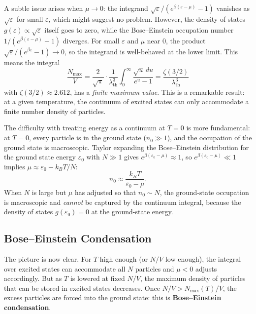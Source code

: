A subtle issue arises when $\mu \to 0$: the integrand $\sqrt{\varepsilon}/(e^{\beta(\varepsilon-\mu)}-1)$ vanishes as $\sqrt{\varepsilon}$ for small $\varepsilon$, which might suggest no problem. However, the density of states $g(\varepsilon) \propto \sqrt{\varepsilon}$ itself goes to zero, while the Bose--Einstein occupation number $1/(e^{\beta(\varepsilon-\mu)}-1)$ diverges. For small $\varepsilon$ and $\mu$ near 0, the product $\sqrt{\varepsilon}/(e^{\beta\varepsilon}-1) \to 0$, so the integrand is well-behaved at the lower limit. This means the integral
\begin{equation}
    \frac{N_{\text{max}}}{V} = \frac{2}{\sqrt{\pi}}\cdot\frac{1}{\lambda_{\text{th}}^3}\int_0^\infty \frac{\sqrt{u}\,du}{e^u - 1} = \frac{\zeta(3/2)}{\lambda_{\text{th}}^3}
\end{equation}
with $\zeta(3/2) \approx 2.612$, has a \emph{finite maximum value}. This is a remarkable result: at a given temperature, the continuum of excited states can only accommodate a finite number density of particles.

The difficulty with treating energy as a continuum at $T=0$ is more fundamental: at $T=0$, every particle is in the ground state ($n_0 \gg 1$), and the occupation of the ground state is macroscopic. Taylor expanding the Bose--Einstein distribution for the ground state energy $\varepsilon_0$ with $N \gg 1$ gives $e^{\beta(\varepsilon_0 - \mu)} \approx 1$, so $e^{\beta(\varepsilon_0 - \mu)} \ll 1$ implies $\mu \approx \varepsilon_0 - k_BT/N$:
\begin{equation}
    n_0 \approx \frac{k_BT}{\varepsilon_0 - \mu}.
\end{equation}
When $N$ is large but $\mu$ has adjusted so that $n_0 \sim N$, the ground-state occupation is macroscopic and \emph{cannot} be captured by the continuum integral, because the density of states $g(\varepsilon_0) = 0$ at the ground-state energy.

\subsection{Bose--Einstein Condensation}

The picture is now clear. For $T$ high enough (or $N/V$ low enough), the integral over excited states can accommodate all $N$ particles and $\mu < 0$ adjusts accordingly. But as $T$ is lowered at fixed $N/V$, the maximum density of particles that can be stored in excited states decreases. Once $N/V > N_{\text{max}}(T)/V$, the excess particles are forced into the ground state: this is \textbf{Bose--Einstein condensation}.


